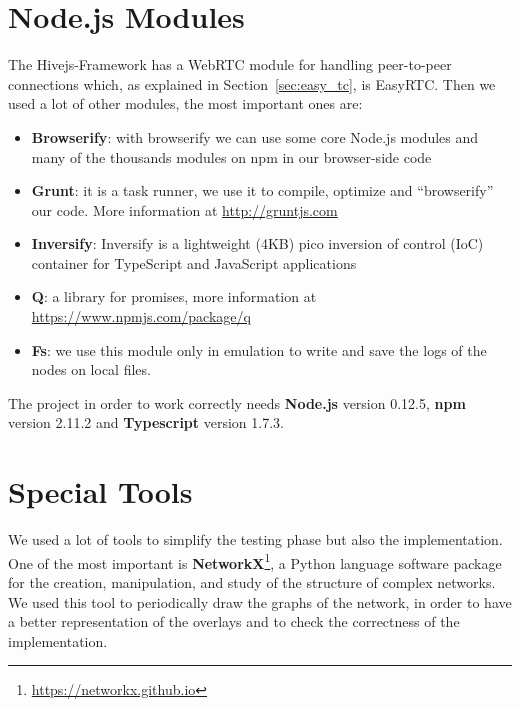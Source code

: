 \section{Node.js Modules}
\label{sec:modules}
The Hivejs-Framework has a WebRTC module for handling peer-to-peer connections which, as explained in Section~\ref{sec:easy_tc}, is EasyRTC. Then we used a lot of other modules, the most important ones are:

\begin{itemize}
	\item \textbf{Browserify}: with browserify we can use some core Node.js modules and many of the thousands modules on npm in our browser-side code
	\item \textbf{Grunt}: it is a task runner, we use it to compile, optimize and ``browserify'' our code. More information at \url{http://gruntjs.com}
	\item \textbf{Inversify}: Inversify is a lightweight (4KB) pico inversion of control (IoC) container for TypeScript and JavaScript applications
	\item \textbf{Q}: a library for promises, more information at \url{https://www.npmjs.com/package/q}
	\item \textbf{Fs}: we use this module only in emulation to write and save the logs of the nodes on local files.
\end{itemize}

The project in order to work correctly needs \textbf{Node.js} version 0.12.5, \textbf{npm} version 2.11.2 and \textbf{Typescript} version 1.7.3.

\section{Special Tools}
We used a lot of tools to simplify the testing phase but also the implementation. One of the most important is \textbf{NetworkX}\footnote{\url{https://networkx.github.io}}, a Python language software package for the creation, manipulation, and study of the structure of complex networks. We used this tool to periodically draw the graphs of the network, in order to have a better representation of the overlays and to check the correctness of the implementation. 


